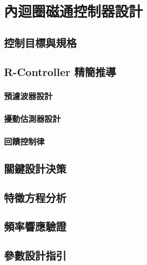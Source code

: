 \chapter{內迴圈磁通控制器設計}
\label{c:flux_control}

\section{控制目標與規格}
\label{sec:flux_ctrl_objective}


\section{R-Controller 精簡推導}
\label{sec:r_controller}


\subsection{預濾波器設計}
\label{subsec:prefilter}


\subsection{擾動估測器設計}
\label{subsec:disturbance_estimator}


\subsection{回饋控制律}
\label{subsec:feedback_law}


\section{關鍵設計決策}
\label{sec:design_decision}


\section{特徵方程分析}
\label{sec:characteristic_eq}


\section{頻率響應驗證}
\label{sec:flux_bode}


\section{參數設計指引}
\label{sec:param_guidelines}

